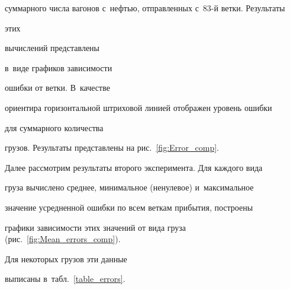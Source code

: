 суммарного числа вагонов с~нефтью, отправленных с~83-й ветки. Результаты




этих


вычислений представлены %


{в~виде} графиков зависимости %


ошибки от ветки. В~качест\-ве %


ориен\-ти\-ра горизонтальной штриховой линией отображен уровень ошибки


для суммарного количества


грузов. Результаты представлены на рис.~\ref{fig:Error_comp}.





Далее рассмотрим результаты второго эксперимента. Для каждого вида


груза вычислено среднее, минимальное (ненулевое) и~максимальное


значение усредненной ошибки по всем веткам прибытия, построены


графики зависимости этих значений от вида груза (рис.~\ref{fig:Mean_errors_comp}).


Для некоторых грузов эти данные


выписаны в~табл.~\ref{table_errors}.





